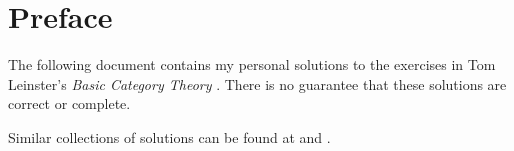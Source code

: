 \chapter*{Preface}

The following document contains my personal solutions to the exercises in Tom Leinster’s \emph{Basic Category Theory} \cite{leinster_basic_category}.
There is no guarantee that these solutions are correct or complete.

Similar collections of solutions can be found at \cite{positron_basic_category_theory_solutions} and \cite{weiss_basic_category_theory_solutions}.
